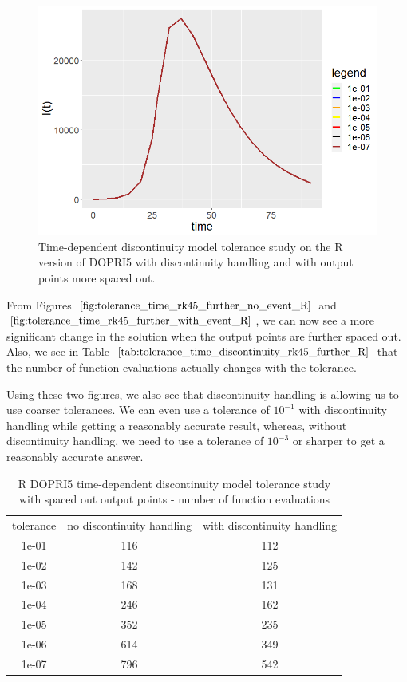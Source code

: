 \begin{figure}[H]
\centering
\includegraphics[width=0.7\linewidth]{./figures/tolerance_time_rk45_further_with_event_R}
\caption{Time-dependent discontinuity model tolerance study on the R version of DOPRI5 with discontinuity handling and with output points more spaced out.}
\label{fig:tolerance_time_rk45_further_with_event_R}
\end{figure}

From Figures $\ref{fig:tolerance_time_rk45_further_no_event_R}$ and $\ref{fig:tolerance_time_rk45_further_with_event_R}$, we can now see a more significant change in the solution when the output points are further spaced out. Also, we see in Table $\ref{tab:tolerance_time_discontinuity_rk45_further_R}$ that the number of function evaluations actually changes with the tolerance.

Using these two figures, we also see that discontinuity handling is allowing us to use coarser tolerances. We can even use  a tolerance of $10^{-1}$ with discontinuity handling while getting a reasonably accurate result, whereas, without discontinuity handling, we need to use a tolerance of $10^{-3}$ or sharper to get a reasonably accurate answer.

\begin{table}[H]
\caption {R DOPRI5 time-dependent discontinuity model tolerance study with spaced out output points - number of function evaluations} \label{tab:tolerance_time_discontinuity_rk45_further_R} 
\begin{center}
\begin{tabular}{ c c c }
tolerance & no discontinuity handling & with discontinuity handling \\ 
1e-01 & 116 & 112 \\
1e-02 & 142 & 125 \\
1e-03 & 168 & 131 \\
1e-04 & 246 & 162 \\
1e-05 & 352 & 235 \\
1e-06 & 614 & 349 \\
1e-07 & 796 & 542 \\
\end{tabular}
\end{center}
\end{table}

